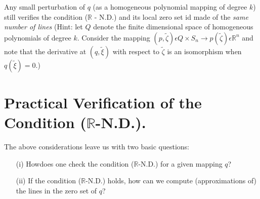 \begin{comment}\label{chap2-com1.3}
Recall\pageoriginale that a continuous {\em odd} mapping defined on the sphere $S_{m-1} \subset \mathbb{R}^{m}$ with values in $\mathbb{R}^{n}$ always vanishes at some point of $S_{m-1}$ when $m > n$. Here, with $m = n + 1$ we deduce that $\nu \geq 1$ when $k$ is {\em odd}. When $k$ is {\em even}, it can be shown (cf. Buchner, Marsden and Schecter \cite{5}) taht $\nu$ is {\em even too} (possibly 0 however).
\end{comment}

\begin{remark}\label{chap2-rem1.2}
Any small perturbation of $q$ (as a homogeneous polynomial mapping of degree $k$) still verifies the condition ($\mathbb{R}$ - N.D.) and its local zero set id made of the {\em same number of lines} (Hint: let $Q$ denote the finite dimensional space of homogeneous polynomials of degree $k$. Consider the mapping $(p, \widetilde{\zeta}) \epsilon Q \times S_{n} \to p(\widetilde{\zeta}) \epsilon \mathbb{R}^{n}$ and note that the derivative at $(q, \widetilde{\xi})$ with respect to $\widetilde{\zeta}$ is an isomorphism when $q(\widetilde{\xi}) = 0$.)
\end{remark}

\begin{comment}\label{chap2-com1.4}
  Condition ($\mathbb{R}$-N.D.) ensures that the zero set of $q$ in $\mathbb{R}^{n+1}$ is made of a finite number of lines through the origin. The converse is {\em not} true\footnote{Incidentlly, we have shown that the zero set of $q$ is a finite union of lines, when $n = 1$, {\em with no assumption other than} $q \nequiv 0$.}. Actually, the condition ($\mathbb{R}$-N.D.) also shows that each line in the zero set is ``simple'' in the way described in Remark \ref{chap2-rem1.2}. When the condition ($\mathbb{R}$.N.D.) does not hold but the zero set of $q$ is still made up of a finite number of lines, some of them are ``multiple'', namely, split into {\em several lines} or else {\em disappear} when replacing $q$ by a suitable small perturbation.
\end{comment}

\section{Practical Verification of the Condition ($\mathbb{R}$-N.D.).}\label{chap2-sec2}

The above considerations leave us with two basic questions:
\begin{enumerate}
\item[(i)] How\pageoriginale does one check the condition ($\mathbb{R}$-N.D.) for a given mapping $q$?

\item[(ii)] If the condition ($\mathbb{R}$-N.D.) holds, how can we compute (approximations of) the lines in the zero set of $q$?
\end{enumerate}

